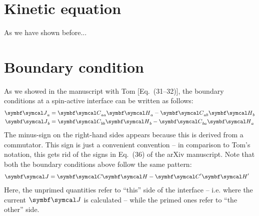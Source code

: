 \clearpage
\section{Kinetic equation}
As we have shown before...



\clearpage
\section{Boundary condition}
As we showed in the manuscript with Tom [Eq.~(31--32)], the boundary conditions at a spin-active interface can be written as follows:
\begin{align}
  \BC{J}_a &= \BC{C}_{aa} \BC{H}_a - \BC{C}_{ab} \BC{H}_b \\
  \BC{J}_b &= \BC{C}_{bb} \BC{H}_b - \BC{C}_{ba} \BC{H}_a 
\end{align}
The minus-sign on the right-hand sides appears because this is derived from a commutator. 
This sign is just a convenient convention -- in comparison to Tom's notation, this gets rid of the signs in Eq.~(36) of the arXiv manuscript.
Note that both the boundary conditions above follow the same pattern:
\begin{align}
  \BC{J} &= \BC{C} \BC{H} - \BC{C}'\BC{H}'
\end{align}
Here, the unprimed quantities refer to ``this'' side of the interface -- i.e. where the current $\BC{J}$ is calculated -- while the primed ones refer to ``the other'' side.


